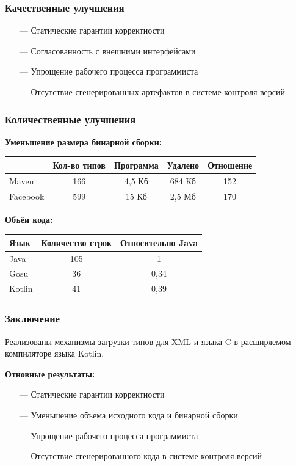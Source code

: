 \documentclass[12pt]{beamer}
\newcommand{\nl}{\vspace{\baselineskip}}
\begin{document}
\begin{frame}\frametitle{Качественные улучшения}
\linespread{1.1}
\begin{Large}
    \begin{itemize}
        \item[---] Статические гарантии корректности
        \item[---] Согласованность с внешними интерфейсами
        \item[---] Упрощение рабочего процесса программиста
        \item[---] Отсутствие сгенерированных артефактов в системе контроля версий
    \end{itemize}
\end{Large}
\linespread{1}
\end{frame}

\begin{frame}\frametitle{Количественные улучшения}
\begin{small}
\textbf{Уменьшение размера бинарной сборки:}
\begin{table}[!h]
    \begin{tabular}{ | l | c | c | c | c | }
    \hline
               & Кол-во типов & Программа & Удалено & Отношение \\ \hline
    Maven      & 166   & 4,5 Кб  & 684 Кб & 152 \\ \hline
    Facebook   & 599   & 15 Кб  & 2,5 Мб & 170 \\ \hline
    \end{tabular}
\end{table}

\textbf{Объёи кода:}
\begin{table}[!h]
    \begin{tabular}{ | l | c | c | }
    \hline
    Язык    & Количество строк & Относительно Java \\ \hline
    Java    & 105   & 1 \\ \hline
    Gosu    & 36    & 0,34  \\ \hline
    Kotlin  & 41    & 0,39 \\
    \hline
    \end{tabular}
\end{table}

\end{small}
\end{frame}

\begin{frame}\frametitle{Заключение}
\begin{large}
Реализованы механизмы загрузки типов для XML и языка C в расширяемом компиляторе языка Kotlin. \nl

\textbf{Отновные результаты:}
    \begin{itemize}
        \item[---] Статические гарантии корректности
        \item[---] Уменьшение объема исходного кода и бинарной сборки
        \item[---] Упрощение рабочего процесса программиста
        \item[---] Отсутствие сгенерированного кода в системе контроля версий
    \end{itemize}
\end{large}
\end{frame}
\end{document}
